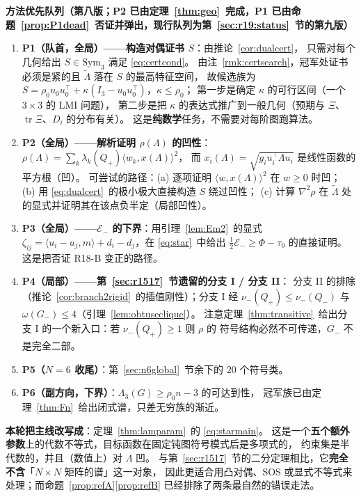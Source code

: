 \documentclass[UTF8,11pt]{ctexart}
\theoremstyle{definition}
\newcommand{\Lam}{\Lambda}
\newcommand{\tr}{\operatorname{tr}}
\begin{document}
\textbf{方法优先队列（第八版；P2 已由定理~\ref{thm:geo}~完成，P1 已由命题~\ref{prop:P1dead}~否证并弹出，现行队列为第~\ref{sec:r19:status}~节的第九版）}
\begin{enumerate}\itemsep3pt
\item \textbf{P1（队首，全局）——构造对偶证书 $S$}：由推论~\ref{cor:dualcert}，
只需对每个几何给出 $S\in\mathrm{Sym}_3$ 满足 \eqref{eq:certcond}。
由注~\ref{rmk:certsearch}，冠军处证书必须是紧的且 $\tilde\Lam$ 落在 $S$ 的最高特征空间，
故候选族为 $S=\rho_0u_0u_0^\top+\kappa(I_3-u_0u_0^\top)$，$\kappa\le\rho_0$；
第一步是确定 $\kappa$ 的可行区间（一个 $3\times3$ 的 LMI 问题），
第二步是把 $\kappa$ 的表达式推广到一般几何（预期与 $\Xi$、$\tr\Xi$、$D_i$ 的分布有关）。
这是\textbf{纯数学}任务，不需要对每阶图跑算法。
\item \textbf{P2（全局）——解析证明 $\rho(\Lam)$ 的凹性}：
$\rho(\Lam)=\sum_k\lambda_k(Q_+)\langle w_k,x(\Lam)\rangle^2$，
而 $x_i(\Lam)=\sqrt{g_iu_i^\top\Lam u_i}$ 是线性函数的平方根（凹）。
可尝试的路径：(a) 逐项证明 $\langle w,x(\Lam)\rangle^2$ 在 $w\ge0$ 时凹；
(b) 用 \eqref{eq:dualcert}~的极小极大直接构造 $S$ 绕过凹性；
(c) 计算 $\nabla^2\rho$ 在 $\tilde\Lam$ 处的显式并证明其在该点负半定（局部凹性）。
\item \textbf{P3（全局）——$\mathcal E_-$ 的下界}：用引理~\ref{lem:Em2}~的显式
$\zeta_{ij}=\langle u_i-u_j,m\rangle+d_i-d_j$，在 \eqref{eq:star}~中给出
$\frac12\mathcal E_-\ge\Phi-\tau_0$ 的直接证明。这是把否证 R18-B 变正的路径。
\item \textbf{P4（局部）——第~\ref{sec:r1517}~节遗留的分支 I / 分支 II}：
分支 II 的排除（推论~\ref{cor:branch2rigid}~的插值刚性）；分支 I 经
$\nu_-(Q_+)\le\nu_-(Q_-)$ 与 $\omega(G_-)\le4$（引理~\ref{lem:obtuseclique}）。
注意定理~\ref{thm:transitive}~给出分支 I 的一个新入口：若 $\nu_-(Q_+)\ge1$ 则 $\rho$ 的
符号结构必然不可传递，$G_-$ 不是完全二部。
\item \textbf{P5（$N=6$ 收尾）}：第~\ref{sec:n6global}~节余下的 $20$ 个符号类。
\item \textbf{P6（副方向，下界）}：$\Lam_3(G)\ge\rho_0n-3$ 的可达到性，
冠军族已由定理~\ref{thm:Fn}~给出闭式谱，只差无穷族的渐近。
\end{enumerate}

\textbf{本轮把主线改写成}：定理~\ref{thm:lamparam}~的 \eqref{eq:starmain}。
这是一个\textbf{五个额外参数}上的代数不等式，目标函数在固定钝图符号模式后是多项式的，
约束集是半代数的，并且（数值上）对 $\Lam$ 凹。
与第~\ref{sec:r1517}~节的二分定理相比，它\textbf{完全不含}「$N\times N$ 矩阵的谱」这一对象，
因此更适合用凸对偶、SOS 或显式不等式来处理；而命题~\ref{prop:refA}\ref{prop:refB}
已经排除了两条最自然的错误走法。
\end{document}
